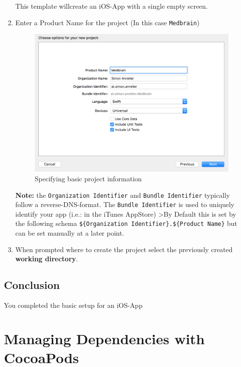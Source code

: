 \documentclass{article}
\begin{document}
\begin{enumerate}
  This template willcreate an iOS-App with a single empty screen.

\item
  Enter a Product Name for the project (In this case \texttt{Medbrain})

  \begin{figure}[H]
  \centering
  \includegraphics[width=\linewidth]{resources/step1/step_1_3.png}
  \caption{Specifying basic project information}
  \label{fig:basic_product_information}
  \end{figure}

  \textbf{Note:} the \texttt{Organization\ Identifier} and
  \texttt{Bundle\ Identifier} typically follow a reverse-DNS-format.
  The \texttt{Bundle\ Identifier} is used to uniquely
  identify your app (i.e.: in the iTunes AppStore) \textgreater{}By
  Default this is set by the following schema
  \texttt{\$\{Organization\ Identifier\}.\$\{Product\ Name\}} but can be
  set manually at a later point.
\item
  When prompted where to create the project select the previously
  created \textbf{working directory}.
\end{enumerate}

\subsection{Conclusion}\label{step1:conclusion}

You completed the basic setup for an iOS-App


\section{Managing Dependencies with
CocoaPods\cite{cocoapods}}\label{step2}
\end{document}
